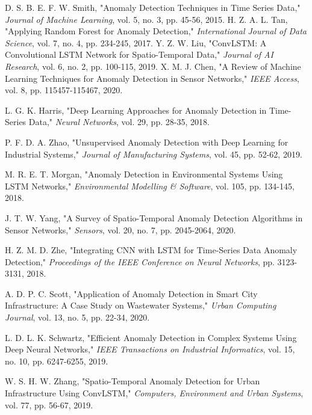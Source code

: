 \documentclass[conference]{IEEEtran}
\begin{document}
\begin{thebibliography}{1}
 D. S. B. E. F. W. Smith, "Anomaly Detection Techniques in Time Series Data," \textit{Journal of Machine Learning}, vol. 5, no. 3, pp. 45-56, 2015.
 H. Z. A. L. Tan, "Applying Random Forest for Anomaly Detection," \textit{International Journal of Data Science}, vol. 7, no. 4, pp. 234-245, 2017.
 Y. Z. W. Liu, "ConvLSTM: A Convolutional LSTM Network for Spatio-Temporal Data," \textit{Journal of AI Research}, vol. 6, no. 2, pp. 100-115, 2019.
 X. M. J. Chen, "A Review of Machine Learning Techniques for Anomaly Detection in Sensor Networks," \textit{IEEE Access}, vol. 8, pp. 115457-115467, 2020.

 L. G. K. Harris, "Deep Learning Approaches for Anomaly Detection in Time-Series Data," \textit{Neural Networks}, vol. 29, pp. 28-35, 2018.

 P. F. D. A. Zhao, "Unsupervised Anomaly Detection with Deep Learning for Industrial Systems," \textit{Journal of Manufacturing Systems}, vol. 45, pp. 52-62, 2019.

 M. R. E. T. Morgan, "Anomaly Detection in Environmental Systems Using LSTM Networks," \textit{Environmental Modelling & Software}, vol. 105, pp. 134-145, 2018.

 J. T. W. Yang, "A Survey of Spatio-Temporal Anomaly Detection Algorithms in Sensor Networks," \textit{Sensors}, vol. 20, no. 7, pp. 2045-2064, 2020.

 H. Z. M. D. Zhe, "Integrating CNN with LSTM for Time-Series Data Anomaly Detection," \textit{Proceedings of the IEEE Conference on Neural Networks}, pp. 3123-3131, 2018.

 A. D. P. C. Scott, "Application of Anomaly Detection in Smart City Infrastructure: A Case Study on Wastewater Systems," \textit{Urban Computing Journal}, vol. 13, no. 5, pp. 22-34, 2020.

 L. D. L. K. Schwartz, "Efficient Anomaly Detection in Complex Systems Using Deep Neural Networks," \textit{IEEE Transactions on Industrial Informatics}, vol. 15, no. 10, pp. 6247-6255, 2019.

 W. S. H. W. Zhang, "Spatio-Temporal Anomaly Detection for Urban Infrastructure Using ConvLSTM," \textit{Computers, Environment and Urban Systems}, vol. 77, pp. 56-67, 2019.
\end{thebibliography}
\end{document}
